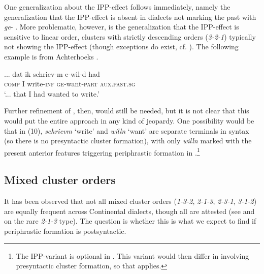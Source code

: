 \documentclass[output=paper]{LSP/langsci}
\begin{document}
One generalization about the IPP-effect follows immediately, namely the generalization that the IPP-effect is absent in dialects not marking the  past with \textit{ge}{}- \citep{Hoeksema1980,Lange1981}. More problematic, however, is the generalization that the IPP-effect is sensitive to linear order, clusters with strictly descending orders (\textit{3-2-1}) typically not showing the IPP-effect (though exceptions do exist, cf. \citealt[78f]{Zwart2007}). The following example is from Achterhoeks  \citep[76]{BlomHoekstra1996}.

\settowidth{}
\ea%
    \label{ex:zwart:10}
    \gll 	  ...  dat  ik  schriev-m  e-wil-d    had    \\
                  {} \textsc{comp}  I  write-\textsc{inf}  \textsc{ge}{}-want-\textsc{part}  \textsc{aux.past.sg}\\
\glt   ‘... that I had wanted to write.’
\z


Further refinement of , then, would still be needed, but it is not clear that this would put the entire approach in any kind of jeopardy. One possibility would be that in (10), \textit{schrievm} ‘write’ and \textit{willn} ‘want’ are separate terminals in syntax (so there is no presyntactic cluster formation), with only \textit{willn} marked with the present anterior features triggering periphrastic  formation in .\footnote{The IPP-variant is optional in . This variant would then differ in involving presyntactic cluster formation, so that  applies.}

\subsection{Mixed cluster orders}
It has been observed that not all mixed cluster orders (\textit{1-3-2}, \textit{2-1-3}, \textit{2-3-1}, \textit{3-1-2}) are equally frequent across Continental  dialects, though all are attested (see \citealt{Zwart2007} and \citealt{Salzmann2016} on the rare \textit{2-1-3} type). The {question} is whether this is what we expect to find if periphrastic  formation is postsyntactic.
\end{document}
